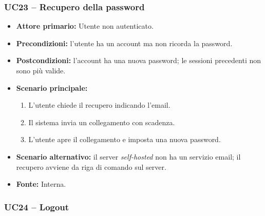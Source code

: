 \documentclass[12pt,a4paper]{article}
\newcommand{\tightlist}{\setlength{\itemsep}{1pt}\setlength{\parskip}{0pt}}
\begin{document}
\subsubsection{UC23 -- Recupero della password}

\begin{itemize}

\tightlist

\item \textbf{Attore primario:} Utente non autenticato.

\item \textbf{Precondizioni:} l'utente ha un account ma non ricorda la password.

\item \textbf{Postcondizioni:} l'account ha una nuova password; le sessioni precedenti non sono più valide.

\item \textbf{Scenario principale:}

\begin{enumerate}

\tightlist

\item L'utente chiede il recupero indicando l'email.

\item Il sistema invia un collegamento con scadenza.

\item L'utente apre il collegamento e imposta una nuova password.

\end{enumerate}

\item \textbf{Scenario alternativo:} il server \emph{self-hosted} non ha un servizio email; il recupero avviene da riga di comando sul server.

\item \textbf{Fonte:} Interna.

\end{itemize}



\subsubsection{UC24 -- Logout}
\end{document}
